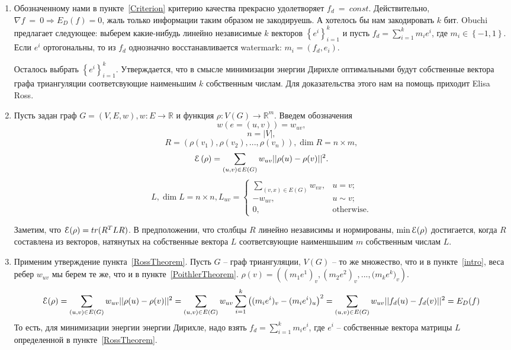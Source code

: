 \documentclass{article}
\begin{document}
\begin{enumerate}
    \item Обозначенному нами в пункте~\ref{Criterion} критерию качества прекрасно удолетворяет $f_d~=~const$. 
    Действительно, $\nabla{f}~=~0 \Rightarrow E_D(f) = 0$, жаль только информации таким образом не закодируешь. А хотелось бы нам закодировать $k$ бит.
    Obuchi предлагает следующее: выберем какие-нибудь линейно независимые $k$ векторов $\left\{ e^i \right\}_{i=1}^k$ и пусть $f_d = \sum_{i=1}^{k}{m_i e^i}$,
    где $m_i \in \left\{ -1, 1 \right\}$. Если $e^i$ ортогональны, то из $f_d$ однозначно восстанавливается watermark: $m_i = (f_d, e_i)$.

    Осталось выбрать $\left\{ e^i \right\}_{i=1}^k$. Утверждается, что в смысле минимизации энергии Дирихле оптимальными будут собственные вектора графа триангуляции соответсвующие наименьшим $k$ собственным числам. Для доказательства этого нам на помощь приходит Elisa Ross.
    
    \item \label{RossTheorem}
    Пусть задан граф $G = (V, E, w), w: E \to \mathbb{R}$ и функция $\rho: V(G) \to \mathbb{R}^m$. Введем обозначения 
    $$ w(e = (u, v)) = w_{uv},$$
    $$ n = |V|, $$
    $$ R = \left(\rho(v_1), \rho(v_2), ... , \rho(v_n)\right), \dim{R} = n \times m, $$
    $$ \EuScript{E}\left(\rho\right) = \sum_{\left(u, v \right) \in E\left( G \right)}{w_{uv} ||\rho(u) - \rho(v)||^2}.$$
    $$ L, \dim{L} = n \times n, L_{uv} = \begin{cases}
        \sum_{(v, x) \in E(G)}{w_{vx}},&\text{$u = v;$} \\
        -w_{uv},&\text{$u \sim v;$} \\
        0, &\text{otherwise.}
    \end{cases}
    $$
    
    Заметим, что $\EuScript{E}(\rho) = tr(R^T L R)$. В предположении, что столбцы $R$ линейно независимы и нормированы, $\min{\EuScript{E}(\rho)}$ достигается, 
    когда $R$ составлена из векторов, натянутых на собственные вектора $L$ соответсвующие наименшьшим $m$ собственным числам $L$.
     
    \item Применим утверждение пункта~\ref{RossTheorem}. Пусть $G$ -- граф триангуляции, $V(G)$ -- то же множество, что и в пункте~\ref{intro}, 
    веса ребер $w_{uv}$ мы берем те же, что и в пункте~\ref{PoithlerTheorem}. $\rho(v) = \left( {(m_1 e^1)_v}, {(m_2 e^2)_v}, ..., {(m_k e^k})_v \right)$.
    $$
        \EuScript{E}(\rho) = \sum_{\left( u, v \right) \in E \left( G \right)}{w_{uv} ||\rho(u) - \rho(v)||^2} = 
        \sum_{\left( u, v \right) \in E \left( G \right)}{w_{uv} \sum_{i=1}^k{\left((m_i e^i)_v - (m_i e^i)_u \right)^2}} =
        \sum_{\left( u, v \right) \in E \left( G \right)}{w_{uv} ||f_d(u) - f_d(v)||^2} = E_D(f)
    $$
    То есть, для минимизации энергии энергии Дирихле, надо взять $f_d = \sum_{i=1}^k{m_i e^i}$, где $e^i$ -- собственные вектора матрицы $L$ определенной 
    в пункте~\ref{RossTheorem}.
\end{enumerate}
\end{document}
